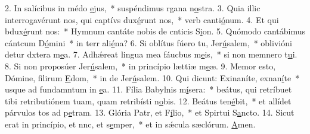 2. In salícibus in médo \uline{e}jus,~* suspéndimus rgana n\uline{o}stra.
3. Quia illic interrogavérunt nos, qui captívs dux\uline{é}runt nos,~* verb canti\uline{ó}num.
4. Et qui bdux\uline{é}runt nos:~* Hymnum cantáte nobis de cnticis S\uline{i}on.
5. Quómodo cantábimus cántcum D\uline{ó}mini~* in terr ali\uline{é}na?
6. Si oblítus fúero tu, Jer\uline{ú}salem,~* oblivióni detur dxtera m\uline{e}a.
7. Adhǽreat lingua mea fáucbus m\uline{e}is,~* si non memnero t\uline{u}i.
8. Si non proposúer Jer\uline{ú}salem,~* in princípio lættiæ m\uline{e}æ.
9. Memor esto, Dómine, filirum \uline{E}dom,~* in de Jer\uline{ú}salem.
10. Qui dicunt: Exinaníte, exnan\uline{í}te~* usque ad fundamntum in \uline{e}a.
11. Fília Babylnis m\uline{í}sera:~* beátus, qui retríbuet tibi retributiónem tuam, quam retribísti n\uline{o}bis.
12. Beátus  ten\uline{é}bit,~* et allídet párvulos tos ad p\uline{e}tram.
13. Glória Patr, et F\uline{í}lio,~* et Spirtui S\uline{a}ncto.
14. Sicut erat in princípio, et nnc, et s\uline{e}mper,~* et in sǽcula sæclórum. \uline{A}men.

